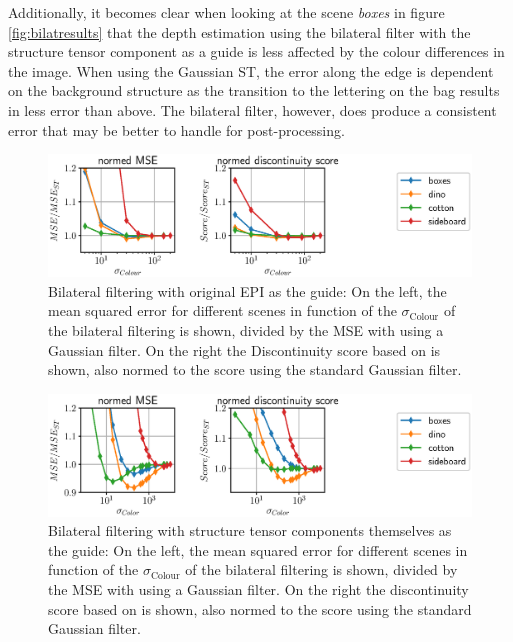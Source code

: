 \documentclass  [
  paper    = a4,
  BCOR     = 10mm,
  twoside,
  fontsize = 12pt,
  fleqn,
  toc      = bibnumbered,
  toc      = listofnumbered,
  numbers  = noendperiod,
  headings = normal,
  listof   = leveldown,
  version  = 3.03
]                                       {scrreprt}
\begin{document}
 Additionally, it becomes clear when looking at the scene \textit{boxes} in figure \ref{fig:bilatresults} that the depth estimation using the bilateral filter with the structure tensor component as a guide is less affected by the colour differences in the image. When using the Gaussian ST, the error along the edge is dependent on the background structure as the transition to the lettering on the bag results in less error than above. The bilateral filter, however, does produce a consistent error that may be better to handle for post-processing.

\begin{figure}[h!]
	\centering
	\includegraphics[width=1\linewidth]{images/bilateral_params}
	\caption[Parameter dependency for bilateral filtering using EPI]{Bilateral filtering with original EPI as the guide: On the left, the mean squared error for different scenes in function of the $\sigma_\text{Colour}$ of the bilateral filtering is shown, divided by the MSE with using a Gaussian filter. On the right the Discontinuity score based on \cite{honauer2016benchmark} is shown, also normed to the score using the standard Gaussian filter.}
	\label{fig:bilateralparams}
\end{figure}
\begin{figure}[h!]
	\centering
	\includegraphics[width=1\linewidth]{images/bilateral_norm_params}
	\caption[Parameter dependency for bilateral filtering]{Bilateral filtering with structure tensor components themselves as the guide: On the left, the mean squared error for different scenes in function of the $\sigma_\text{Colour}$ of the bilateral filtering is shown, divided by the MSE with using a Gaussian filter. On the right the discontinuity score based on \cite{honauer2016benchmark} is shown, also normed to the score using the standard Gaussian filter.}
	\label{fig:bilateralnormparams}
\end{figure}
\end{document}
